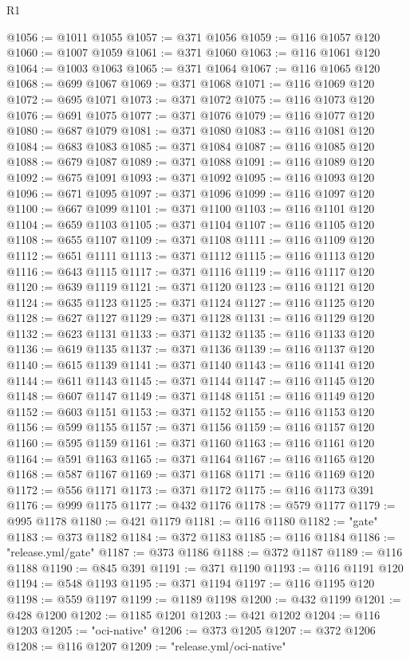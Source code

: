 \begin{lexlean}{R1}
\begin{coremodule}
@1056 := @1011 @1055
@1057 := @371 @1056
@1059 := @116 @1057 @120
@1060 := @1007 @1059
@1061 := @371 @1060
@1063 := @116 @1061 @120
@1064 := @1003 @1063
@1065 := @371 @1064
@1067 := @116 @1065 @120
@1068 := @699 @1067
@1069 := @371 @1068
@1071 := @116 @1069 @120
@1072 := @695 @1071
@1073 := @371 @1072
@1075 := @116 @1073 @120
@1076 := @691 @1075
@1077 := @371 @1076
@1079 := @116 @1077 @120
@1080 := @687 @1079
@1081 := @371 @1080
@1083 := @116 @1081 @120
@1084 := @683 @1083
@1085 := @371 @1084
@1087 := @116 @1085 @120
@1088 := @679 @1087
@1089 := @371 @1088
@1091 := @116 @1089 @120
@1092 := @675 @1091
@1093 := @371 @1092
@1095 := @116 @1093 @120
@1096 := @671 @1095
@1097 := @371 @1096
@1099 := @116 @1097 @120
@1100 := @667 @1099
@1101 := @371 @1100
@1103 := @116 @1101 @120
@1104 := @659 @1103
@1105 := @371 @1104
@1107 := @116 @1105 @120
@1108 := @655 @1107
@1109 := @371 @1108
@1111 := @116 @1109 @120
@1112 := @651 @1111
@1113 := @371 @1112
@1115 := @116 @1113 @120
@1116 := @643 @1115
@1117 := @371 @1116
@1119 := @116 @1117 @120
@1120 := @639 @1119
@1121 := @371 @1120
@1123 := @116 @1121 @120
@1124 := @635 @1123
@1125 := @371 @1124
@1127 := @116 @1125 @120
@1128 := @627 @1127
@1129 := @371 @1128
@1131 := @116 @1129 @120
@1132 := @623 @1131
@1133 := @371 @1132
@1135 := @116 @1133 @120
@1136 := @619 @1135
@1137 := @371 @1136
@1139 := @116 @1137 @120
@1140 := @615 @1139
@1141 := @371 @1140
@1143 := @116 @1141 @120
@1144 := @611 @1143
@1145 := @371 @1144
@1147 := @116 @1145 @120
@1148 := @607 @1147
@1149 := @371 @1148
@1151 := @116 @1149 @120
@1152 := @603 @1151
@1153 := @371 @1152
@1155 := @116 @1153 @120
@1156 := @599 @1155
@1157 := @371 @1156
@1159 := @116 @1157 @120
@1160 := @595 @1159
@1161 := @371 @1160
@1163 := @116 @1161 @120
@1164 := @591 @1163
@1165 := @371 @1164
@1167 := @116 @1165 @120
@1168 := @587 @1167
@1169 := @371 @1168
@1171 := @116 @1169 @120
@1172 := @556 @1171
@1173 := @371 @1172
@1175 := @116 @1173 @391
@1176 := @999 @1175
@1177 := @432 @1176
@1178 := @579 @1177
@1179 := @995 @1178
@1180 := @421 @1179
@1181 := @116 @1180
@1182 := "gate"
@1183 := @373 @1182
@1184 := @372 @1183
@1185 := @116 @1184
@1186 := "release.yml/gate"
@1187 := @373 @1186
@1188 := @372 @1187
@1189 := @116 @1188
@1190 := @845 @391
@1191 := @371 @1190
@1193 := @116 @1191 @120
@1194 := @548 @1193
@1195 := @371 @1194
@1197 := @116 @1195 @120
@1198 := @559 @1197
@1199 := @1189 @1198
@1200 := @432 @1199
@1201 := @428 @1200
@1202 := @1185 @1201
@1203 := @421 @1202
@1204 := @116 @1203
@1205 := "oci-native"
@1206 := @373 @1205
@1207 := @372 @1206
@1208 := @116 @1207
@1209 := "release.yml/oci-native"

\end{coremodule}
\end{lexlean}
